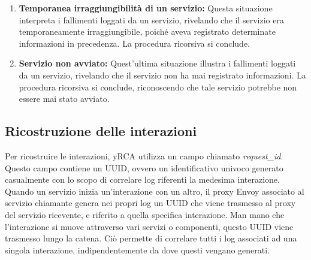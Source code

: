 \begin{enumerate}
\item \textbf{Temporanea irraggiungibilità di un servizio:} Questa situazione interpreta i fallimenti loggati da un servizio, rivelando che il servizio era temporaneamente irraggiungibile, poiché aveva registrato determinate informazioni in precedenza. La procedura ricorsiva si conclude.

\item \textbf{Servizio non avviato:} Quest'ultima situazione illustra i fallimenti loggati da un servizio, rivelando che il servizio non ha mai registrato informazioni. La procedura ricorsiva si conclude, riconoscendo che tale servizio potrebbe non essere mai stato avviato.
\end{enumerate}

\subsection{Ricostruzione delle interazioni}
Per ricostruire le interazioni, yRCA utilizza un campo chiamato \textit{request\_id}. Questo campo contiene un UUID\cite{leach_uuid_urn}, ovvero un identificativo univoco generato casualmente con lo scopo di correlare log riferenti la medesima interazione. Quando un servizio inizia un'interazione con un altro, il proxy Envoy associato al servizio chiamante genera nei propri log un UUID che viene trasmesso al proxy del servizio ricevente, e riferito a quella specifica interazione. Man mano che l'interazione si muove attraverso vari servizi o componenti, questo UUID viene trasmesso lungo la catena. Ciò permette di correlare tutti i log associati ad una singola interazione, indipendentemente da dove questi vengano generati.